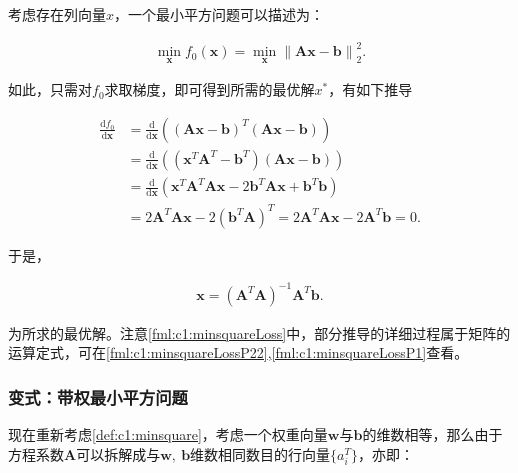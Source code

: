 考虑存在列向量$x$，一个最小平方问题可以描述为：

\begin{problem}[最简的最小平方问题] \label{def:c1:minsquare}
	\begin{align} \label{fml:c1:minsquare}
		\min\limits_{\mathbf{x}} f_0(\mathbf{x}) = \min\limits_{\mathbf{x}} {\lVert \mathbf{A}\mathbf{x} - \mathbf{b} \rVert}^2_2.
	\end{align}
\end{problem}

如此，只需对$f_0$求取梯度，即可得到所需的最优解$x^{\ast}$，有如下推导

\begin{equation}\label{fml:c1:minsquareLoss}
	\begin{aligned}
		\frac{\mathrm{d}f_0}{\mathrm{d}\mathbf{x}} &= \frac{\mathrm{d}}{\mathrm{d}\mathbf{x}} \left( (\mathbf{A}\mathbf{x} - \mathbf{b})^{T}(\mathbf{A}\mathbf{x} - \mathbf{b}) \right)\\
		&= \frac{\mathrm{d}}{\mathrm{d}\mathbf{x}} \left( (\mathbf{x}^{T}\mathbf{A}^{T} - \mathbf{b}^{T})(\mathbf{A}\mathbf{x} - \mathbf{b}) \right)\\
		&= \frac{\mathrm{d}}{\mathrm{d}\mathbf{x}} \left( \mathbf{x}^{T}\mathbf{A}^{T}\mathbf{A}\mathbf{x} - 2\mathbf{b}^{T}\mathbf{A}\mathbf{x} + \mathbf{b}^{T}\mathbf{b} \right)\\
		&= 2\mathbf{A}^T\mathbf{A}\mathbf{x}-2(\mathbf{b}^{T}\mathbf{A})^T = 2\mathbf{A}^T\mathbf{A}\mathbf{x}-2\mathbf{A}^T\mathbf{b} = 0.
	\end{aligned}
\end{equation}

于是，

\begin{equation}\label{fml:c1:minsquareLossOpt}
	\begin{aligned}
		\mathbf{x} = (\mathbf{A}^T\mathbf{A})^{-1}\mathbf{A}^T\mathbf{b}.
	\end{aligned}
\end{equation}

为所求的最优解。注意\eqref{fml:c1:minsquareLoss}中，部分推导的详细过程属于矩阵的运算定式，可在\eqref{fml:c1:minsquareLossP22},\eqref{fml:c1:minsquareLossP1}查看。

\subsubsection{变式：带权最小平方问题}
现在重新考虑\autoref{def:c1:minsquare}，考虑一个权重向量$\mathbf{w}$与$\mathbf{b}$的维数相等，那么由于方程系数$\mathbf{A}$可以拆解成与$\mathbf{w},~\mathbf{b}$维数相同数目的行向量$\{a^T_{i}\}$，亦即：

